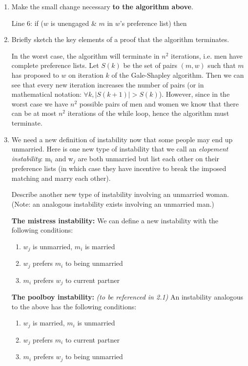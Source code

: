 \documentclass[11pt, oneside]{article}   	%
\theoremstyle{definition}
\theoremstyle{remark}
\begin{document}
\begin{enumerate}
	\item Make the small change necessary \textbf{to the algorithm above}.
	
	\qquad Line 6: if ($w$ is unengaged \& $m$ in $w$'s preference list) then
	\item Briefly sketch the key elements of a proof that the algorithm terminates.
	
	In the worst case, the algorithm will terminate in $n^2$ iterations, i.e. men have complete preference lists. Let $S(k)$ be the set of pairs $(m, w)$ such that $m$ has proposed to $w$ on iteration $k$ of the Gale-Shapley algorithm. Then we can see that every new iteration increases the number of pairs (or in mathematical notation: $\forall k, |S(k+1)| > S(k)$). However, since in the worst case we have $n^2$ possible pairs of men and women we know that there can be at most $n^2$ iterations of the while loop, hence the algorithm must terminate.
	
	
	\item We need a new definition of instability now that some people may
   end up unmarried. Here is one new type of instability that we call
   an \emph{elopement instability}: m$_i$ and w$_j$ are both unmarried but list
   each other on their preference lists (in which case they have
   incentive to break the imposed matching and marry each other).
   
   Describe another new type of instability involving an unmarried
   woman. (Note: an analogous instability exists involving an
   unmarried man.)
   
   \textbf{The mistress instability: } We can define a new instability with the following conditions:
   		\begin{enumerate}
   			\item $w_j$ is unmarried, $m_i$ is married
   			\item $w_j$ prefers $m_i$ to being unmarried 
   			\item $m_i$ prefers $w_j$ to current partner
   
   \end{enumerate}
   \textbf{The poolboy instability: }\textit{(to be referenced in 2.1)} An instability analogous to the above has the following conditions: 
   \begin{enumerate}
   			\item $w_j$ is married, $m_i$ is unmarried
   			\item $w_j$ prefers $m_i$ to current partner
   			\item $m_i$ prefers $w_j$ to being unmarried
   

\end{enumerate}
\end{enumerate}
\end{document}
